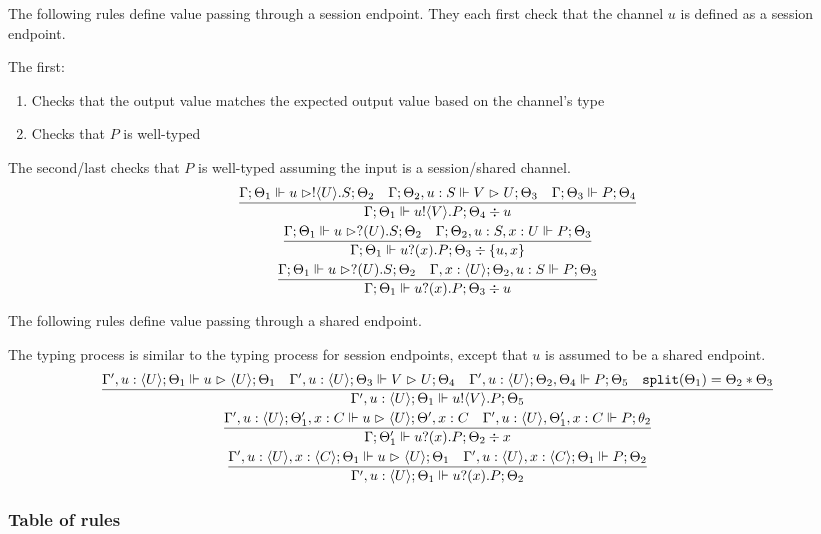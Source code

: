 The following rules define value passing through a session endpoint.
They each first check that the channel $u$ is defined as a session endpoint.

The first:
\begin{enumerate}
\item Checks that the output value matches the expected output value based on the channel's type
\item Checks that $P$ is well-typed
\end{enumerate}

The second/last checks that $P$ is well-typed assuming the input is a session/shared channel.
\begin{gather*}
\frac{\Gamma ; \Theta_1 \Vdash u \vartriangleright !\langle U \rangle . S ; \Theta_2 \quad \Gamma ; \Theta_2 , u : S \Vdash V \vartriangleright U ; \Theta_3 \quad \Gamma ; \Theta_3 \Vdash P ; \Theta_4}{\Gamma ; \Theta_1 \Vdash u ! \langle V \rangle . P ; \Theta_4 \div u} \\
\frac{\Gamma ;\Theta_1 \Vdash u \vartriangleright ?(U).S ; \Theta_2 \quad \Gamma ; \Theta_2 , u : S , x : U \Vdash P ; \Theta_3}{\Gamma ; \Theta_1 \Vdash u ? (x) . P ; \Theta_3 \div \{u,x\}} \\
\frac{\Gamma ; \Theta_1 \Vdash u \vartriangleright ?(U) . S ; \Theta_2 \quad \Gamma, x : \langle U \rangle ; \Theta_2 , u : S \Vdash P ; \Theta_3}{\Gamma ; \Theta_1 \Vdash u? (x) . P ; \Theta_3 \div u}
\end{gather*}

The following rules define value passing through a shared endpoint.

The typing process is similar to the typing process for session endpoints, except that $u$ is assumed to be a shared endpoint.
\begin{gather*}
\frac{\Gamma' , u : \langle U \rangle ; \Theta_1 \Vdash u \vartriangleright \langle U \rangle ; \Theta_1 \quad \Gamma' , u : \langle U \rangle ; \Theta_3 \Vdash V \vartriangleright U ; \Theta_4 \quad \Gamma', u : \langle U \rangle ; \Theta_2, \Theta_4 \Vdash P ; \Theta_5 \quad \texttt{split}(\Theta_1) = \Theta_2 * \Theta_3}{\Gamma', u : \langle U \rangle ; \Theta_1 \Vdash u ! \langle V \rangle . P ; \Theta_5} \\
\frac{\Gamma' , u : \langle U \rangle ; \Theta_1', x : C \Vdash u \vartriangleright \langle U \rangle ; \Theta' , x : C \quad \Gamma' , u : \langle U \rangle , \Theta_1', x : C \Vdash P ; \theta_2}{\Gamma ; \Theta_1' \Vdash u ? (x) . P ; \Theta_2 \div x} \\
\frac{\Gamma' , u : \langle U \rangle , x : \langle C \rangle ; \Theta_1 \Vdash u \vartriangleright \langle U \rangle ; \Theta_1 \quad \Gamma' , u : \langle U \rangle , x : \langle C \rangle ; \Theta_1 \Vdash P ; \Theta_2}{\Gamma', u : \langle U \rangle ; \Theta_1 \Vdash u ? (x) . P ; \Theta_2} \\
\end{gather*}

\subsubsection{Table of rules}
